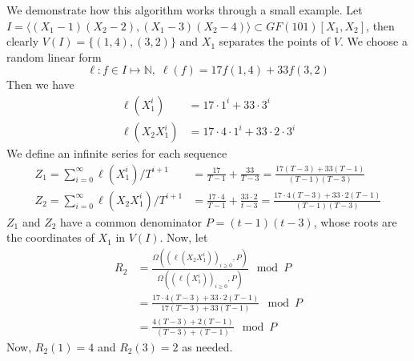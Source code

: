 \documentclass[12pt]{article}
\begin{document}
We demonstrate how this algorithm works through a small example. Let 
$I = \langle (X_1-1)(X_2-2),(X_1-3)(X_2-4)\rangle \subset
GF(101)[X_1,X_2]$, then
clearly $V(I) = \{ (1,4),(3,2) \}$ and $X_1$ separates the
points of $V$. We choose a random linear form 
$$\ell: f \in I \mapsto \mathbb{N},\;\ell(f) = 17 f(1,4) + 33 f(3,2)$$
Then we have
\begin{align*}
\ell(X_1^i) &= 17 \cdot 1^i + 33 \cdot 3^i\\
\ell(X_2X_1^i) &= 17 \cdot 4 \cdot 1^i + 33 \cdot 2 \cdot 3^i
\end{align*} 
We define an infinite series for each sequence
\begin{align*}
Z_1 = \sum_{i = 0}^{\infty} \ell(X^i_1) / T^{i+1}
&= \frac{17}{T-1} + \frac{33}{T-3}
= \frac{17(T-3)+33(T-1)}{(T-1)(T-3)} \\
Z_2 = \sum_{i=0}^{\infty} \ell(X_2X^i_1)/T^{i+1} 
&= \frac{17\cdot 4}{T-1} + \frac{33 \cdot 2}{t-3}
= \frac{17\cdot 4 (T-3) + 33\cdot 2(T-1)}{(T-1)(T-3)}
\end{align*}
$Z_1$ and $Z_2$ have a common denominator $P = (t-1)(t-3)$,
whose roots are the coordinates of $X_1$ in $V(I)$. Now, let
\begin{align*}
R_2 
&=\frac{\Omega((\ell(X_2X^i_1))_{i\ge 0},P)}{\Omega((\ell(X^i_1))_{i\ge 0},P)} \mod P\\
&= 
\frac{17\cdot 4 (T-3) + 33\cdot 2(T-1)}{17(T-3)+33(T-1)} \mod P\\
&=\frac{4 (T-3) + 2(T-1)}{(T-3)+(T-1)} \mod P
\end{align*}
Now, $ R_2(1) = 4$ and $R_2(3) = 2$ as needed.
\end{document}
